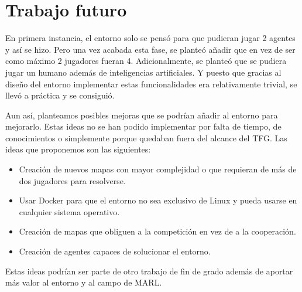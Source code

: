 \chapter{Trabajo futuro}

En primera instancia, el entorno solo se pensó para que pudieran jugar 2 agentes y así se hizo. Pero una vez acabada esta fase, se planteó añadir que en vez de ser como máximo 2 jugadores fueran 4. Adicionalmente, se planteó que se pudiera jugar un humano además de inteligencias artificiales. Y puesto que gracias al diseño del entorno implementar estas funcionalidades era relativamente trivial, se llevó a práctica y se consiguió.

Aun así, planteamos posibles mejoras que se podrían añadir al entorno para mejorarlo. Estas ideas no se han podido implementar por falta de tiempo, de conocimientos o simplemente porque quedaban fuera del alcance del TFG. Las ideas que proponemos son las siguientes:

\begin{itemize}
    \item Creación de nuevos mapas con mayor complejidad o que requieran de más de dos jugadores para resolverse.
    \item Usar Docker para que el entorno no sea exclusivo de Linux y pueda usarse en cualquier sistema operativo.
    \item Creación de mapas que obliguen a la competición en vez de a la cooperación.
    \item Creación de agentes capaces de solucionar el entorno.
\end{itemize}

Estas ideas podrían ser parte de otro trabajo de fin de grado además de aportar más valor al entorno y al campo de MARL.